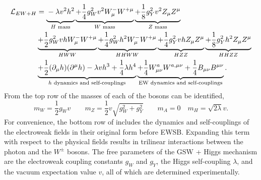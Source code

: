 \begin{equation}
	\label{eq:higgs_lagrangian_full}
	\resizebox{.99\hsize}{!}{$
			\begin{aligned}
				\mathcal{L}_{EW+H}
				 & = \underbrace{\vphantom{\frac{}{}} - \lambda v^2 h^2}_{H \text{ mass}}
				\underbrace{+\frac{1}{4} g_W^2 v^2 W^-_\mu W^{+\mu}}_{W \text{ mass}}
				\underbrace{+\frac{1}{8} g_Y^2 v^2 Z_\mu Z^\mu}_{Z \text{ mass}}                                                                                 \\
				 & \underbrace{+\frac{1}{2} g_W^2 v h W^-_\mu W^{+\mu}}_{HWW}
				\underbrace{+\frac{1}{4} g_W^2 h^2 W^-_\mu W^{+\mu}}_{HHWW}
				\underbrace{+\frac{1}{4} g_Y^2 v h Z_\mu Z^\mu}_{HZZ}
				\underbrace{+\frac{1}{8} g_Y^2 h^2 Z_\mu Z^\mu}_{HHZZ}                                                                                           \\
				 & \underbrace{+\frac{1}{2}(\partial_{\mu} h)(\partial^{\mu} h) - \lambda v h^3 + \frac{1}{4}\lambda h^4}_{h\text{ dynamics and self-couplings}}
				\underbrace{+\frac{1}{4} W^a_{\mu\nu} W^{a,\mu\nu} + \frac{1}{4} B_{\mu\nu} B^{\mu\nu}}_{\text{EW dynamics and self-couplings}}.
			\end{aligned}
		$}
\end{equation}
From the top row of  the masses of each of the bosons can be identified,
\begin{equation}
	\label{eq:ew_masses}
	m_W = \frac{1}{2} g_W v
	\qquad
	m_Z = \frac{1}{2} v \sqrt{g_W^2 + g_Y^2}
	\qquad
	m_A = 0
	\quad
	m_H = \sqrt{2 \lambda} v.
\end{equation}
For convenience, the bottom row of  includes the dynamics and self-couplings of the electroweak fields in their original form before EWSB.
Expanding this term with respect to the physical fields results in trilinear interactions between the photon and the $W^\pm$ bosons.
The free parameters of the GSW + Higgs mechanism are the electroweak coupling constants $g_W$ and $g_Y$, the Higgs self-coupling $\lambda$, and the vacuum expectation value $v$, all of which are determined experimentally.

